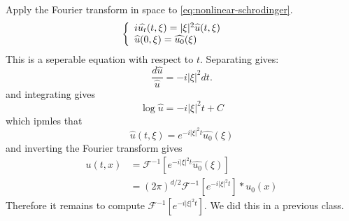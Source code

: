 \documentclass{article}
\begin{document}
Apply the Fourier transform in space to \cref{eq:nonlinear-schrodinger}.
\begin{equation*}\label{eq:transformed-nonlinear-schrodinger}
  \left\{ \begin{array}{l@{\quad\quad}l}
      i\widehat{u_{t}}(t,\xi) = |\xi|^{2}\widehat{u}(t,\xi)  \\
      \widehat{u}(0,\xi)=\widehat{u_{0}}(\xi) 
    \end{array}\right.
\end{equation*}
This is a seperable equation with respect to $t$. Separating gives:
\begin{equation*} 
  \frac{d\widehat{u}}{\widehat{u}} = -i |\xi|^{2}dt.
\end{equation*}
and integrating gives
\begin{equation*}
  \log \widehat{u} = -i |\xi|^{2}t+C
\end{equation*}
which ipmles that
\begin{equation*}
  \widehat{u}(t,\xi) = e^{-i |\xi|^{2}t}\widehat{u_{0}}(\xi)
\end{equation*}
and inverting the Fourier transform gives
\begin{align*}
  u(t,x) 
  &= \mathcal{F}^{-1}\left[ e^{-i|\xi|^{2}t} \widehat{u_{0}}(\xi) \right]\\
  &= \left( 2\pi \right)^{d/2}  \mathcal{F}^{-1}\left[ e^{-i|\xi|^{2}t}  \right]*u_{0}(x)
\end{align*}
Therefore it remains to compute $\mathcal{F}^{-1}\left[ e^{-i|\xi|^{2}t}\right]
$. We did this in a previous class.
\end{document}
